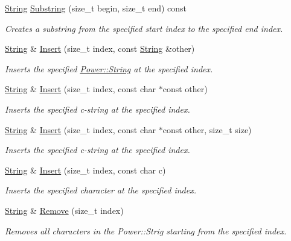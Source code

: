 \begin{DoxyCompactItemize}
\hyperlink{class_power_1_1_string}{String} \hyperlink{class_power_1_1_string_a648cd16b1af13b87a20d623d933f067c}{Substring} (size\+\_\+t begin, size\+\_\+t end) const
\begin{DoxyCompactList}\small\item\em Creates a substring from the specified start index to the specified end index. \end{DoxyCompactList}\item 
\hyperlink{class_power_1_1_string}{String} \& \hyperlink{class_power_1_1_string_a2d92ca786aa910d06176b4107bebc285}{Insert} (size\+\_\+t index, const \hyperlink{class_power_1_1_string}{String} \&other)
\begin{DoxyCompactList}\small\item\em Inserts the specified \hyperlink{class_power_1_1_string}{Power\+::\+String} at the specified index. \end{DoxyCompactList}\item 
\hyperlink{class_power_1_1_string}{String} \& \hyperlink{class_power_1_1_string_a44a8b56904401398d11ad927699414f4}{Insert} (size\+\_\+t index, const char $\ast$const other)
\begin{DoxyCompactList}\small\item\em Inserts the specified c-\/string at the specified index. \end{DoxyCompactList}\item 
\hyperlink{class_power_1_1_string}{String} \& \hyperlink{class_power_1_1_string_a5cb85c37854d3efaffd8f676ab9765e5}{Insert} (size\+\_\+t index, const char $\ast$const other, size\+\_\+t size)
\begin{DoxyCompactList}\small\item\em Inserts the specified c-\/string at the specified index. \end{DoxyCompactList}\item 
\hyperlink{class_power_1_1_string}{String} \& \hyperlink{class_power_1_1_string_a2a7e5bcd31c35003a35949cfd993528a}{Insert} (size\+\_\+t index, const char c)
\begin{DoxyCompactList}\small\item\em Inserts the specified character at the specified index. \end{DoxyCompactList}\item 
\hyperlink{class_power_1_1_string}{String} \& \hyperlink{class_power_1_1_string_a02dcfcbe27a01bf938d9ce038a0487ef}{Remove} (size\+\_\+t index)
\begin{DoxyCompactList}\small\item\em Removes all characters in the Power\+::\+Strig starting from the specified index. \end{DoxyCompactList}\item 

\end{DoxyCompactItemize}
